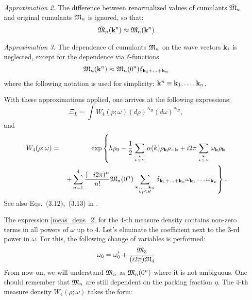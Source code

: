{\it Approximation 2.} The difference between renormalized values of cumulants $\tilde{\frak M}_n$ and original cumulants $\frak M_n$ is ignored, so that:
\begin{equation}
	\tilde{\frak M}_n(\vb k^n) \approx \frak M_n(\vb k^n)
\end{equation}

{\it Approximation 3.} The dependence of cumulants $\frak M_n$ on the wave vectors $\vb k_i$ is neglected, except for the dependence via $\delta$-functions
\begin{equation}
	\frak{M}_n({\vb k}^n) \approx \frak{M}_n(0^n) \delta_{\vb{k}_1 + \dotsc + \vb{k}_n}
\end{equation}
where the following notation is used for simplicity: ${\vb k}^n\equiv {\vb k}_1, \dotsc, {\vb k}_n$.

With these approximations applied, one arrives at the following expressions:
\begin{equation}
	\label{gpf_l4}
	\Xi_L = \int W_4 (\rho;\omega) (d\rho)^{N_B}(d\omega)^{N_B}, 
\end{equation}
and
\begin{eqnarray}
	\label{meas_dens_2}
	W_4(\rho;\omega) &=& \exp \left\{ h\rho_0
	- \frac12  \sum\limits_{{\vb k}\atop k\le B} \alpha(k) \rho_{\vb k} \rho_{-{\vb k}}
	+ i2\pi \sum\limits_{{\vb k} \atop k\le B} \omega_{\vb k} \rho_{\vb k} \right.  
	\\
	&& \left.+
	\sum\limits_{n=1}^4 \frac{(-i2\pi)^n}{n!} 
	{\frak M}_n(0^n)
	\sum\limits_{\vb{k}_1,\dotsc,\vb{k}_n\atop{k_i \le B}}
	\delta_{\vb{k}_1 + \dotsc + \vb{k}_n} 
	\omega_{{\vb k}_1} \dots \omega_{{\vb k}_n} \right\}.
	\nonumber
\end{eqnarray}
See also Eqs.~(3.12),~(3.13) in \cite{Yukh1990}.

The expression \ref{meas_dens_2} for the $4$-th measure density contains non-zero terms in all powers of $\omega$ up to 4. Let's eliminate the coefficient next to the 3-rd power in $\omega$. For this, the following change of variables is performed:
\begin{equation}
	\omega_0 = \omega'_0 + \frac{\frak M_3}{(i2\pi) \frak M_4}
\end{equation}
From now on, we will understand $\frak M_n$ as $\frak{M}_n(0^n)$ where it is not ambiguous. One should remember that $\frak M_n$ are still dependent on the packing fraction $\eta$.
The 4-th measure density $W_4(\rho; \omega)$ takes the form:

